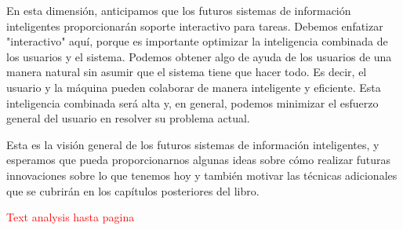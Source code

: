 En esta dimensión, anticipamos que los futuros sistemas de información inteligentes proporcionarán soporte interactivo para tareas. Debemos enfatizar "interactivo" aquí, porque es importante optimizar la inteligencia combinada de los usuarios y el sistema. Podemos obtener algo de ayuda de los usuarios de una manera natural sin asumir que el sistema tiene que hacer todo. Es decir, el usuario y la máquina pueden colaborar de manera inteligente y eficiente. Esta inteligencia combinada será alta y, en general, podemos minimizar el esfuerzo general del usuario en resolver su problema actual.

Esta es la visión general de los futuros sistemas de información inteligentes, y esperamos que pueda proporcionarnos algunas ideas sobre cómo realizar futuras innovaciones sobre lo que tenemos hoy y también motivar las técnicas adicionales que se cubrirán en los capítulos posteriores del libro.


\textcolor{red}{Text analysis hasta pagina }
